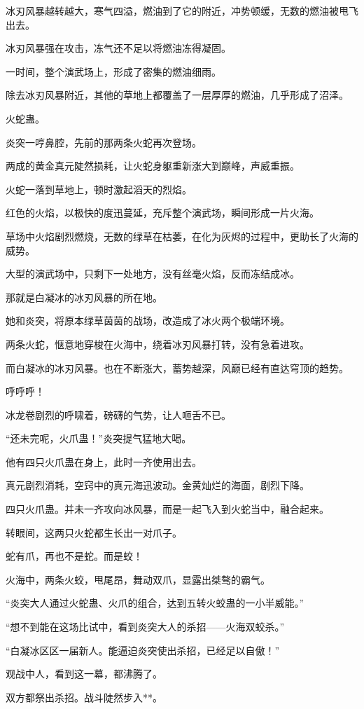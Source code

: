 \begin{this_body}
冰刃风暴越转越大，寒气四溢，燃油到了它的附近，冲势顿缓，无数的燃油被甩飞出去。

冰刃风暴强在攻击，冻气还不足以将燃油冻得凝固。

一时间，整个演武场上，形成了密集的燃油细雨。

除去冰刃风暴附近，其他的草地上都覆盖了一层厚厚的燃油，几乎形成了沼泽。

火蛇蛊。

炎突一哼鼻腔，先前的那两条火蛇再次登场。

两成的黄金真元陡然损耗，让火蛇身躯重新涨大到巅峰，声威重振。

火蛇一落到草地上，顿时激起滔天的烈焰。

红色的火焰，以极快的度迅蔓延，充斥整个演武场，瞬间形成一片火海。

草场中火焰剧烈燃烧，无数的绿草在枯萎，在化为灰烬的过程中，更助长了火海的威势。

大型的演武场中，只剩下一处地方，没有丝毫火焰，反而冻结成冰。

那就是白凝冰的冰刃风暴的所在地。

她和炎突，将原本绿草茵茵的战场，改造成了冰火两个极端环境。

两条火蛇，惬意地穿梭在火海中，绕着冰刃风暴打转，没有急着进攻。

而白凝冰的冰刃风暴。也在不断涨大，蓄势越深，风巅已经有直达穹顶的趋势。

呼呼呼！

冰龙卷剧烈的呼啸着，磅礴的气势，让人咂舌不已。

“还未完呢，火爪蛊！”炎突提气猛地大喝。

他有四只火爪蛊在身上，此时一齐使用出去。

真元剧烈消耗，空窍中的真元海迅波动。金黄灿烂的海面，剧烈下降。

四只火爪蛊。并未一齐攻向冰风暴，而是一起飞入到火蛇当中，融合起来。

转眼间，这两只火蛇都生长出一对爪子。

蛇有爪，再也不是蛇。而是蛟！

火海中，两条火蛟，甩尾昂，舞动双爪，显露出桀骜的霸气。

“炎突大人通过火蛇蛊、火爪的组合，达到五转火蛟蛊的一小半威能。”

“想不到能在这场比试中，看到炎突大人的杀招——火海双蛟杀。”

“白凝冰区区一届新人。能逼迫炎突使出杀招，已经足以自傲！”

观战中人，看到这一幕，都沸腾了。

双方都祭出杀招。战斗陡然步入**。


\end{this_body}
